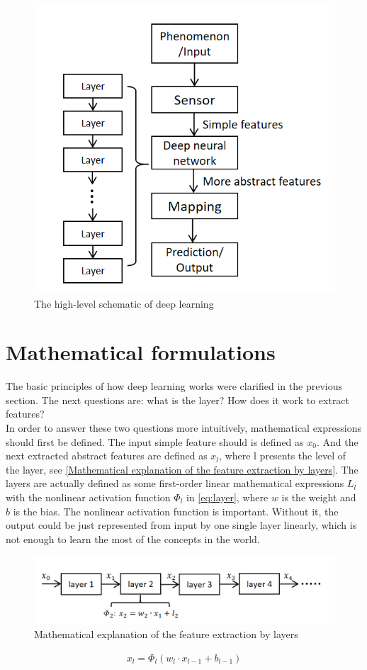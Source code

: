     \begin{figure}
      \centering
      \includegraphics[width=0.6\linewidth]{example_images/DeepLearningSchematic}
      \caption{The high-level schematic of deep learning}
      \label{The high-level schematic of deep learning}
    \end{figure}
  \section{Mathematical formulations}
  The basic principles of how deep learning works were clarified in the previous section. The next questions are: what is the layer? How does it work to extract features?\\
  In order to answer these two questions more intuitively, mathematical expressions should first be defined. The input simple feature should is defined as $x_{0}$. 
  And the next extracted abstract features are defined as $x_{l}$, where l presents the level of the layer, see \autoref{Mathematical explanation of the feature extraction by layers}.
  The layers are actually defined as some first-order linear mathematical expressions $L _{l}$ with the nonlinear activation function $\Phi_{l}$ in \autoref{eq:layer}, 
  where $w$ is the weight and $b$ is the bias. The nonlinear activation function is important. Without it, the output could be just represented from input by one single layer linearly,
  which is not enough to learn the most of the concepts in the world.
  \begin{figure}
    \centering
    \includegraphics[width=0.6\linewidth]{example_images/mathLayers}
    \caption{Mathematical explanation of the feature extraction by layers}
    \label{Mathematical explanation of the feature extraction by layers}
  \end{figure}
  \begin{align}
    x_{l}=\Phi _{l}(w_{l} \cdot x_{l-1}+ b_{l-1})
     \label{eq:layer}
  \end{align}